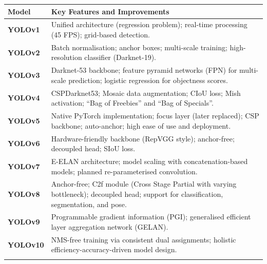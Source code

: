\begin{table}[!htbp]
	\centering
	\small
	\begin{tabularx}{\textwidth}
		{@{\extracolsep{\fill}}>{\raggedright\arraybackslash}m{}
		>{\raggedright\arraybackslash}X}
		\toprule
		\textbf{Model}   & \textbf{Key Features and Improvements}                    \\
		\midrule
		\textbf{YOLOv1}  & Unified architecture (regression problem); real-time
		processing (45 FPS); grid-based detection.                                   \\
		\addlinespace
		\textbf{YOLOv2}  & Batch normalisation; anchor boxes; multi-scale training;
		high-resolution classifier (Darknet-19).                                     \\
		\addlinespace
		\textbf{YOLOv3}  & Darknet-53 backbone; feature pyramid networks (FPN) for
		multi-scale prediction; logistic regression for objectness scores.           \\
		\addlinespace
		\textbf{YOLOv4}  & CSPDarknet53; Mosaic data augmentation; CIoU loss; Mish
		activation; ``Bag of Freebies'' and ``Bag of Specials''.                     \\
		\addlinespace
		\textbf{YOLOv5}  & Native PyTorch implementation; focus layer (later
		replaced); CSP backbone; auto-anchor; high ease of use and deployment.       \\
		\addlinespace
		\textbf{YOLOv6}  & Hardware-friendly backbone (RepVGG style); anchor-free;
		decoupled head; SIoU loss.                                                   \\
		\addlinespace
		\textbf{YOLOv7}  & E-ELAN architecture; model scaling with
		concatenation-based models; planned re-parameterised convolution.            \\
		\addlinespace
		\textbf{YOLOv8}  & Anchor-free; C2f module (Cross Stage Partial with varying
		bottleneck); decoupled head; support for classification, segmentation, and
		pose.                                                                        \\
		\addlinespace
		\textbf{YOLOv9}  & Programmable gradient information (PGI); generalised
		efficient layer aggregation network (GELAN).                                 \\
		\addlinespace
		\textbf{YOLOv10} & NMS-free training via consistent dual assignments;
		holistic efficiency-accuracy-driven model design.                            \\
		\addlinespace

\end{tabularx}
\end{table}
